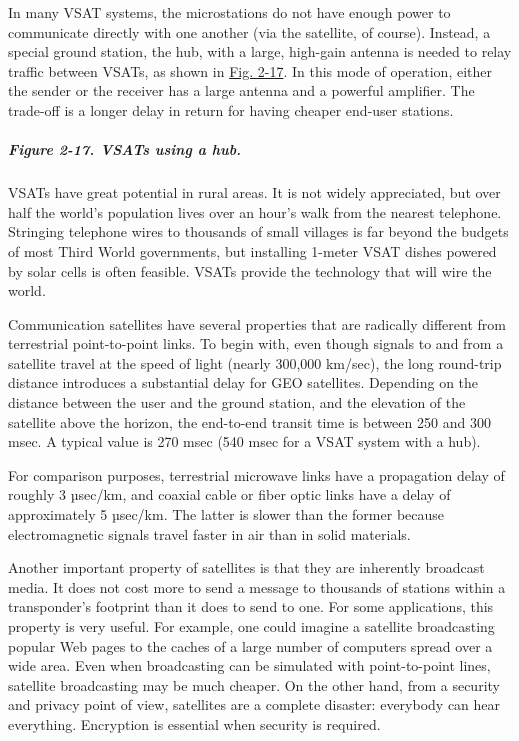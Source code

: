 \documentclass[b5paper,11pt]{memoir}
\begin{document}
In many VSAT systems, the microstations do not have enough power to
communicate directly with one another (via the satellite, of course).
Instead, a special ground station, the {hub}, with a large, high-gain
antenna is needed to relay traffic between VSATs, as shown in
\protect\hyperlink{0130661023_ch02lev1sec4.htmlux5cux23ch02fig17}{Fig.
2-17}. In this mode of operation, either the sender or the receiver has
a large antenna and a powerful amplifier. The trade-off is a longer
delay in return for having cheaper end-user stations.

\subparagraph[Figure 2-17. VSATs using a
hub.]{\texorpdfstring{\protect\hypertarget{0130661023_ch02lev1sec4.htmlux5cux23ch02fig17}{}{}Figure
2-17. VSATs using a hub.}{Figure 2-17. VSATs using a hub.}}


VSATs have great potential in rural areas. It is not widely appreciated,
but over half the world's population lives over an hour's walk from the
nearest telephone. Stringing telephone wires to thousands of small
villages is far beyond the budgets of most Third World governments, but
installing 1-meter VSAT dishes powered by solar cells is often feasible.
VSATs provide the technology that will wire the world.

Communication satellites have several properties that are radically
different from terrestrial point-to-point links. To begin with, even
though signals to and from a satellite travel at the speed of light
(nearly 300,000 km/sec), the long round-trip distance introduces a
substantial delay for GEO satellites. Depending on the distance between
the user and the ground station, and the elevation of the satellite
above the horizon, the end-to-end transit time is between 250 and 300
msec. A typical value is 270 msec (540 msec for a VSAT system with a
hub).

For comparison purposes, terrestrial microwave links have a propagation
delay of roughly 3 µsec/km, and coaxial cable or fiber optic links have
a delay of approximately 5 µsec/km. The latter is slower than the former
because electromagnetic signals travel faster in air than in solid
materials.

Another important property of satellites is that they are inherently
broadcast media. It does not cost more to send a message to thousands of
stations within a transponder's footprint than it does to send to one.
For some applications, this property is very useful. For example, one
could imagine a satellite broadcasting popular Web pages to the caches
of a large number of computers spread over a wide area. Even when
broadcasting can be simulated with point-to-point lines, satellite
broadcasting may be much cheaper. On the other hand, from a security and
privacy point of view, satellites are a complete disaster: everybody can
hear everything. Encryption is essential when security is required.
\end{document}
